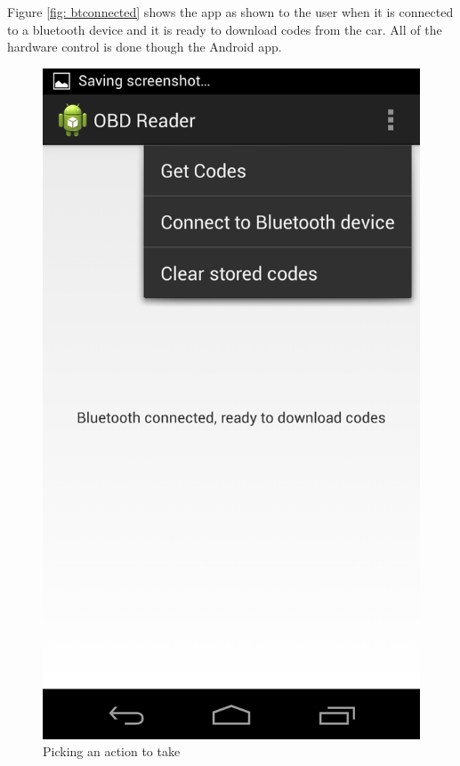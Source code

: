 \documentclass[12pt,letterpaper]{article}
\begin{document}
Figure \ref{fig: btconnected} shows the app as shown to the user when it is connected to a bluetooth device and it is ready to download codes from the car. All of the hardware control is done though the Android app.

\begin{figure}[H]
\centering
\includegraphics[totalheight=15cm]{images/pickaoption.png}
\caption{Picking an action to take}
\label{fig: pickoption}
\end{figure}
\end{document}
